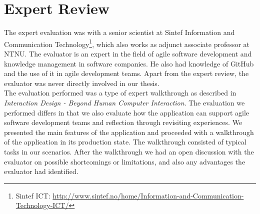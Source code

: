 \chapter{Expert Review}
The expert evaluation was with a senior scientist at Sintef Information and Communication Technology\footnote{Sintef ICT: \url{http://www.sintef.no/home/Information-and-Communication-Technology-ICT/}}, which also works as adjunct associate professor at NTNU. The evaluator is an expert in the field of agile software development and knowledge management in software companies. He also had knowledge of GitHub and the use of it in agile development teams.  Apart from the expert review, the evaluator was never directly involved in our thesis.  \\
The evaluation performed was a type of expert walkthrough as described in \emph{Interaction Design - Beyond Human Computer Interaction}\cite{rogers2011interaction}. The evaluation we performed differs in that we also evaluate how the application can support agile software development teams and reflection through revisiting experiences. We presented the main features of the application and proceeded with a walkthrough of the application in its production state. The walkthrough consisted of typical tasks in our scenarios. After the walkthrough we had an open discussion with the evaluator on possible shortcomings or limitations, and also any advantages the evaluator had identified. 


